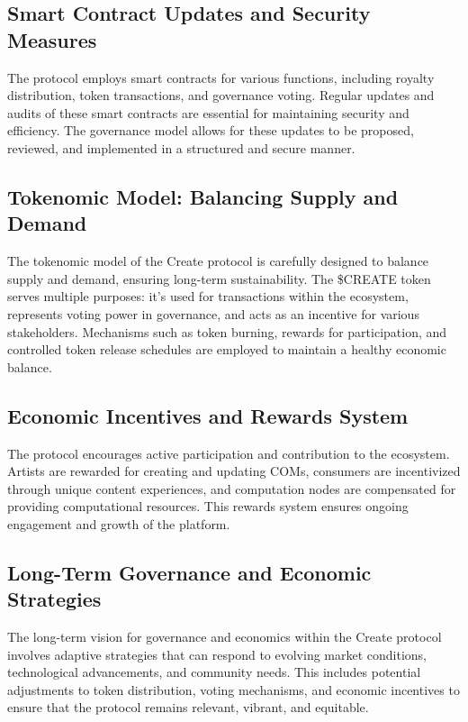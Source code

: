 \documentclass[12pt,a4paper]{article}
\begin{document}
\subsection{Smart Contract Updates and Security Measures}

The protocol employs smart contracts for various functions, including royalty distribution, token transactions, and governance voting. Regular updates and audits of these smart contracts are essential for maintaining security and efficiency. The governance model allows for these updates to be proposed, reviewed, and implemented in a structured and secure manner.

\subsection{Tokenomic Model: Balancing Supply and Demand}

The tokenomic model of the Create protocol is carefully designed to balance supply and demand, ensuring long-term sustainability. The \$CREATE token serves multiple purposes: it's used for transactions within the ecosystem, represents voting power in governance, and acts as an incentive for various stakeholders. Mechanisms such as token burning, rewards for participation, and controlled token release schedules are employed to maintain a healthy economic balance.

\subsection{Economic Incentives and Rewards System}

The protocol encourages active participation and contribution to the ecosystem. Artists are rewarded for creating and updating COMs, consumers are incentivized through unique content experiences, and computation nodes are compensated for providing computational resources. This rewards system ensures ongoing engagement and growth of the platform.

\subsection{Long-Term Governance and Economic Strategies}

The long-term vision for governance and economics within the Create protocol involves adaptive strategies that can respond to evolving market conditions, technological advancements, and community needs. This includes potential adjustments to token distribution, voting mechanisms, and economic incentives to ensure that the protocol remains relevant, vibrant, and equitable.
\end{document}
